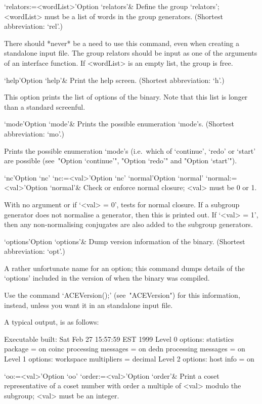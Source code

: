 \>`relators:=<wordList>'{Option `relators'}&
Define the group `relators'; <wordList> must be a list of words in the
group generators.
(Shortest abbreviation: `rel'.)

There should *never* be a need to use this command, even when creating
a standalone input file. The group relators should be input as one  of
the arguments of an {\ACE} interface function.  If  <wordList>  is  an
empty list, the group is free.

\>`help'{Option `help'}&
Print the {\ACE} help screen. (Shortest abbreviation: `h'.)

This option prints the list of options of the {\ACE} binary. Note that
this list is longer than a standard screenful.

\>`mode'{Option `mode'}&
Prints the possible enumeration `mode's.
(Shortest abbreviation: `mo'.)

Prints the possible enumeration  `mode's  (i.e.~which  of  `continue',
`redo' or  `start'  are  possible  (see~"Option  `continue'",  "Option
`redo'" and "Option `start'").

\>`nc'{Option `nc'}
\>`nc:=<val>'{Option `nc'}
\>`normal'{Option `normal'}
\>`normal:=<val>'{Option `normal'}&
Check or enforce normal closure; <val> must be 0 or 1.

With no argument or if `<val> = 0', {\ACE} tests for  normal  closure.
If a subgroup generator does not normalise a generator, then  this  is
printed out. If `<val> = 1', then any non-normalising  conjugates  are
also added to the subgroup generators.

\>`options'{Option `options'}&
Dump version information of the {\ACE} binary.
(Shortest abbreviation: `opt'.)

A rather unfortunate name for an option; this command dumps details of
the \lq{}options' included in the version of {\ACE}  when  the  {\ACE}
binary was compiled.

Use  the   command   `ACEVersion();'   (see~"ACEVersion")   for   this
information, instead, unless you want it in an {\ACE} standalone input
file.

A typical output, is as follows:

\begintt
Executable built:
  Sat Feb 27 15:57:59 EST 1999
Level 0 options:
  statistics package = on
  coinc processing messages = on
  dedn processing messages = on
Level 1 options:
  workspace multipliers = decimal
Level 2 options:
  host info = on
\endtt

\>`oo:=<val>'{Option `oo'}
\>`order:=<val>'{Option `order'}&
Print a coset representative of a coset number with order  a  multiple
of <val> modulo the subgroup; <val> must be an integer.

